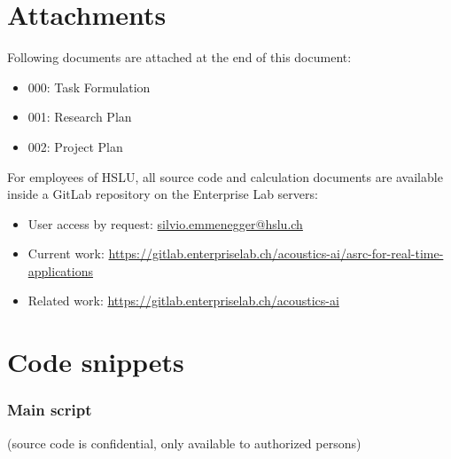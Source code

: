 
\appendix



\section{Attachments}
Following documents are attached at the end of this document:

\begin{itemize}
\setlength{\itemsep}{-2pt}
\item{000: Task Formulation}
\item{001: Research Plan}
\item{002: Project Plan}
\end{itemize}

For employees of \ac{HSLU}, all source code and calculation documents are available inside a GitLab repository on the Enterprise Lab servers:

\begin{itemize}
\item User access by request: \href{mailto:silvio.emmenegger@hslu.ch}{silvio.emmenegger@hslu.ch}
\item Current work: \href{https://gitlab.enterpriselab.ch/acoustics-ai/asrc-for-real-time-applications}{https://gitlab.enterpriselab.ch/acoustics-ai/asrc-for-real-time-applications}
\item Related work: \href{https://gitlab.enterpriselab.ch/acoustics-ai}{https://gitlab.enterpriselab.ch/acoustics-ai} 
\end{itemize}



\newpage
\section{Code snippets}

\subsubsection{Main script}
\label{sec:appdix_main_script}

\iflong {


\newpage
}
\else
	(source code is confidential, only available to authorized persons)
\fi 

